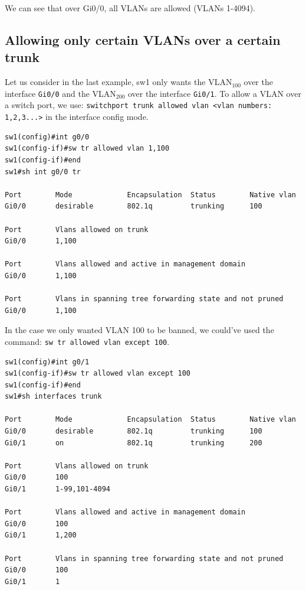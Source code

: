 \noindent
We can see that over Gi0/0, all VLANs are allowed (VLANs 1-4094).

\subsection{Allowing only certain VLANs over a certain trunk}
Let us consider in the last example, sw1 only wants the VLAN$_{100}$ over the interface \verb|Gi0/0| and the VLAN$_{200}$ over the interface \verb|Gi0/1|. To allow a VLAN over a switch port, we use: \verb|switchport trunk allowed vlan <vlan numbers: 1,2,3...>| in the interface config mode.

\vspace{-15pt}
\begin{verbatim}
sw1(config)#int g0/0
sw1(config-if)#sw tr allowed vlan 1,100
sw1(config-if)#end
sw1#sh int g0/0 tr

Port        Mode             Encapsulation  Status        Native vlan
Gi0/0       desirable        802.1q         trunking      100

Port        Vlans allowed on trunk
Gi0/0       1,100

Port        Vlans allowed and active in management domain
Gi0/0       1,100

Port        Vlans in spanning tree forwarding state and not pruned
Gi0/0       1,100
\end{verbatim}
\vspace{-10pt}

\noindent
In the case we only wanted VLAN 100 to be banned, we could've used the command: \verb|sw tr allowed vlan except 100|.

\vspace{-15pt}
\begin{verbatim}
sw1(config)#int g0/1
sw1(config-if)#sw tr allowed vlan except 100
sw1(config-if)#end
sw1#sh interfaces trunk

Port        Mode             Encapsulation  Status        Native vlan
Gi0/0       desirable        802.1q         trunking      100
Gi0/1       on               802.1q         trunking      200

Port        Vlans allowed on trunk
Gi0/0       100
Gi0/1       1-99,101-4094

Port        Vlans allowed and active in management domain
Gi0/0       100
Gi0/1       1,200

Port        Vlans in spanning tree forwarding state and not pruned
Gi0/0       100
Gi0/1       1
\end{verbatim}
\vspace{-10pt}